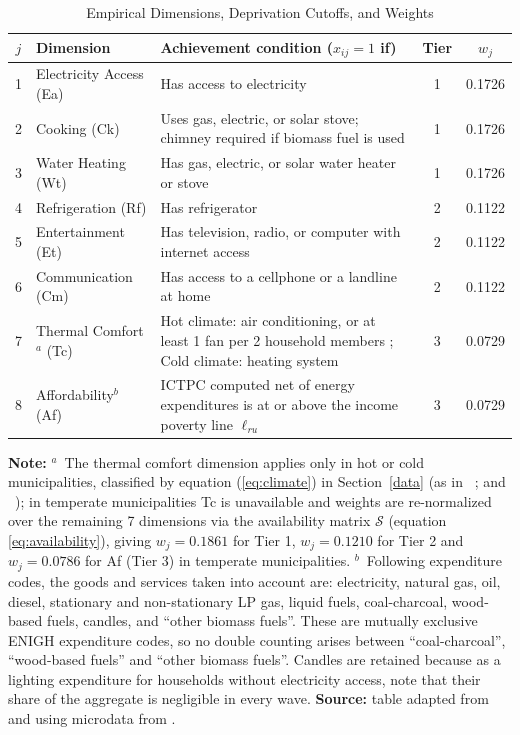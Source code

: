 \documentclass[11pt, a4paper]{article}
\newcommand{\citealp}[1]{\citeauthor{#1}~\citeyear{#1}}
\begin{document}
{
\renewcommand{\arraystretch}{1}
\begin{table}[htb]
\centering
\caption{Empirical Dimensions, Deprivation Cutoffs, and Weights}
\small
\begin{tabularx}{\textwidth}{c l X c c}
\toprule
\toprule
$j$ & Dimension & Achievement condition ($x_{ij}=1$ if) & Tier & $w_j$ \\ \midrule
1 & Electricity Access (Ea) & Has access to electricity & 1 & 0.1726 \\
2 & Cooking (Ck) & Uses gas, electric, or solar stove; chimney required if biomass fuel is used \parencite{coneval2019} & 1 & 0.1726 \\
3 & Water Heating (Wt) & Has gas, electric, or solar water heater or stove & 1 & 0.1726 \\
4 & Refrigeration (Rf) & Has refrigerator & 2 & 0.1122 \\
5 & Entertainment (Et) & Has television, radio, or computer with internet access & 2 & 0.1122 \\
6 & Communication (Cm) & Has access to a cellphone or a landline at home & 2 & 0.1122 \\
7 & Thermal Comfort$^a$ (Tc) & Hot climate: air conditioning, or at least 1 fan per 2 household members \parencite{garciaochoa2016}; Cold climate: heating system & 3 & 0.0729 \\
8 & Affordability$^b$ (Af) & ICTPC computed net of energy expenditures is at or above the income poverty line $\ell_{ru}$ \parencite{hills2011, hills2012} & 3 & 0.0729 \\
\bottomrule
\end{tabularx}
\begin{justify}
\scriptsize
\textbf{\textbf{Note:}} $^a$~The thermal comfort dimension applies only in hot or cold municipalities, classified by equation (\ref{eq:climate}) in Section~\ref{data} (as in \citealp{cedano2021}; and \citealp{robles-bonilla2021}); in temperate municipalities Tc is unavailable and weights are re-normalized over the remaining 7 dimensions via the availability matrix $\mathcal{S}$ (equation \ref{eq:availability}), giving $w_j = 0.1861$ for Tier 1, $w_j = 0.1210$ for Tier 2 and $w_j = 0.0786$ for Af (Tier 3) in temperate municipalities. $^b$~Following \textcite{inegi2023} expenditure codes, the goods and services taken into account are: electricity, natural gas, oil, diesel, stationary and non-stationary LP gas, liquid fuels, coal-charcoal, wood-based fuels, candles, and ``other biomass fuels''. These are mutually exclusive ENIGH expenditure codes, so no double counting arises between ``coal-charcoal'', ``wood-based fuels'' and ``other biomass fuels''. Candles are retained because as a lighting expenditure for households without electricity access, note that their share of the aggregate is negligible in every wave. 
\textbf{\textbf{Source:}} table adapted from \textcite{garciaochoa2016} and \textcite{nussbaumer2012} using microdata from \textcite{enigh2016, enigh2018, enigh2020, enigh2022, enigh2024}.
\end{justify}
\label{tab1}
\end{table}
}
\end{document}
